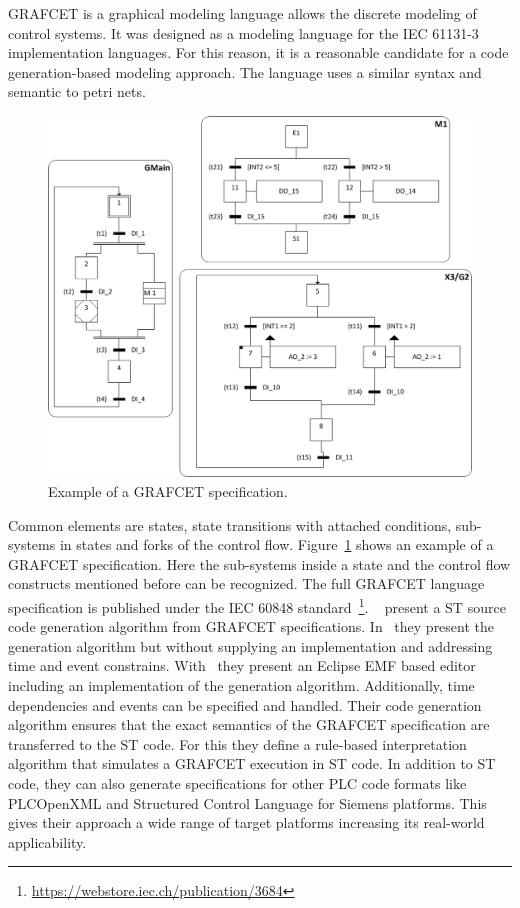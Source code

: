 GRAFCET is a graphical modeling language allows the discrete modeling of control systems.
It was designed as a modeling language for the IEC 61131-3 implementation languages.
For this reason, it is a reasonable candidate for a code generation-based modeling approach.
The language uses a similar syntax and semantic to petri nets.
\begin{figure}
	\includegraphics[width=\textwidth]{./Figures/grafcet_ex.jpg}
	\caption[Example of a GRAFCET specification.]{Example of a GRAFCET specification.~\cite{JULIUS2017173}}
	\label{fig:grafcet}
\end{figure}
Common elements are states, state transitions with attached conditions, sub-systems in states and forks of the control flow.
Figure~\ref{fig:grafcet} shows an example of a GRAFCET specification.
Here the sub-systems inside a state and the control flow constructs mentioned before can be recognized.
The full GRAFCET language specification is published under the IEC 60848 standard~\footnote{\url{https://webstore.iec.ch/publication/3684}}.
\citeauthor{JULIUS20191767}~\cite{JULIUS20191767, JULIUS2017173} present a ST source code generation algorithm from GRAFCET specifications.
In~\cite{JULIUS2017173} they present the generation algorithm but without supplying an implementation and addressing time and event constrains.
With~\cite{JULIUS20191767} they present an Eclipse EMF based editor including an implementation of the generation algorithm.
Additionally, time dependencies and events can be specified and handled.
Their code generation algorithm ensures that the exact semantics of the GRAFCET specification are transferred to the ST code.
For this they define a rule-based interpretation algorithm that simulates a GRAFCET execution in ST code.
In addition to ST code, they can also generate specifications for other PLC code formats like PLCOpenXML and Structured Control Language for Siemens platforms.
This gives their approach a wide range of target platforms increasing its real-world applicability.


